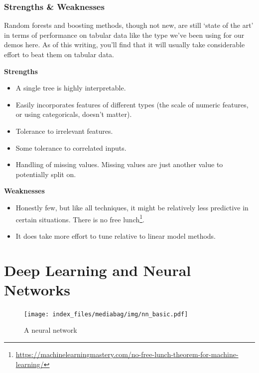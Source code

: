 \documentclass[
  letterpaper,
]{krantz}
\providecommand{\tightlist}{%
  \setlength{\itemsep}{0pt}\setlength{\parskip}{0pt}}\usepackage{longtable,booktabs,array}
\DeclareRobustCommand{\href}[2]{#2\footnote{\url{#1}}}
\begin{document}
\subsubsection{Strengths \& Weaknesses}\label{strengths-weaknesses-1}

Random forests and boosting methods, though not new, are still `state of
the art' in terms of performance on tabular data like the type we've
been using for our demos here. As of this writing, you'll find that it
will usually take considerable effort to beat them on tabular data.

\textbf{Strengths}

\begin{itemize}
\tightlist
\item
  A single tree is highly interpretable.
\item
  Easily incorporates features of different types (the scale of numeric
  features, or using categoricals, doesn't matter).
\item
  Tolerance to irrelevant features.
\item
  Some tolerance to correlated inputs.
\item
  Handling of missing values. Missing values are just another value to
  potentially split on.
\end{itemize}

\textbf{Weaknesses}

\begin{itemize}
\tightlist
\item
  Honestly few, but like all techniques, it might be relatively less
  predictive in certain situations. There is
  \href{https://machinelearningmastery.com/no-free-lunch-theorem-for-machine-learning/}{no
  free lunch}.
\item
  It does take more effort to tune relative to linear model methods.
\end{itemize}

\section{Deep Learning and Neural
Networks}\label{deep-learning-and-neural-networks}

\begin{figure}

{\centering \texttt{[image: index\_files/mediabag/img/nn\_basic.pdf]}

}

\caption{A neural network}

\end{figure}
\end{document}
